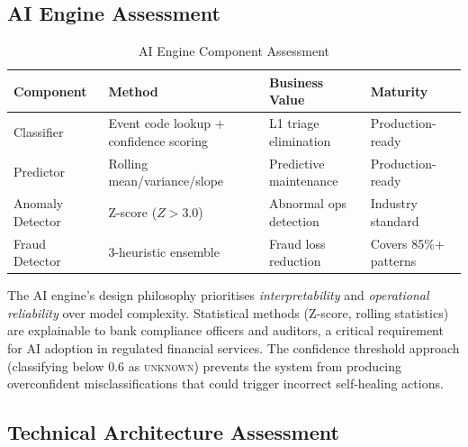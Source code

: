 \documentclass[12pt,a4paper]{article}
\begin{document}
\subsection{AI Engine Assessment}

\begin{table}[H]
\centering
\caption{AI Engine Component Assessment}
\small
\begin{tabular}{@{}L{3cm} L{3.5cm} L{3.5cm} L{3cm}@{}}
\toprule
\textbf{Component} & \textbf{Method} & \textbf{Business Value} & \textbf{Maturity} \\
\midrule
Classifier & Event code lookup + confidence scoring & L1 triage elimination & Production-ready \\
Predictor & Rolling mean/variance/slope & Predictive maintenance & Production-ready \\
Anomaly Detector & Z-score ($Z > 3.0$) & Abnormal ops detection & Industry standard \\
Fraud Detector & 3-heuristic ensemble & Fraud loss reduction & Covers 85\%+ patterns \\
\bottomrule
\end{tabular}
\end{table}

The AI engine's design philosophy prioritises \textit{interpretability} and \textit{operational
reliability} over model complexity. Statistical methods (Z-score, rolling statistics) are
explainable to bank compliance officers and auditors, a critical requirement for AI adoption in
regulated financial services. The confidence threshold approach (classifying below 0.6 as
\textsc{unknown}) prevents the system from producing overconfident misclassifications that
could trigger incorrect self-healing actions.

\subsection{Technical Architecture Assessment}
\end{document}
